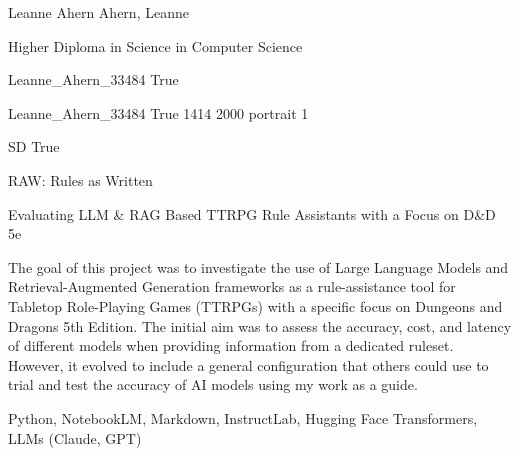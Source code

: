 
\begingroup{}\relax



\def\Key{Leanne_Ahern_33484}

{Leanne Ahern}
{Ahern, Leanne}

{Higher Diploma in Science in Computer Science}

{Leanne_Ahern_33484}
{True}

{Leanne_Ahern_33484}
{True}
{1414}
{2000}
{portrait}
{1}

{SD}
{True}

{RAW: Rules as Written}

{Evaluating LLM \& RAG Based TTRPG Rule Assistants with a Focus on D\&D 5e}

{The goal of this project was to investigate the use of Large Language Models and Retrieval-Augmented Generation frameworks as a rule-assistance tool for Tabletop Role-Playing Games (TTRPGs) with a specific focus on Dungeons and Dragons 5th Edition. The initial aim was to assess the accuracy, cost, and latency of different models when providing information from a dedicated ruleset. However, it evolved to include a general configuration that others could use to trial and test the accuracy of AI models using my work as a guide.}

{Python, NotebookLM, Markdown, InstructLab, Hugging Face Transformers, LLMs (Claude, GPT)}

